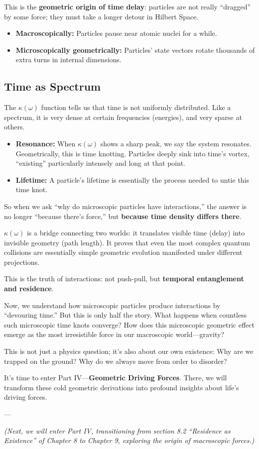 This is the \textbf{geometric origin of time delay}: particles are not really ``dragged'' by some force; they must take a longer detour in Hilbert Space.

\begin{itemize}
\item \textbf{Macroscopically:} Particles pause near atomic nuclei for a while.

\item \textbf{Microscopically geometrically:} Particles' state vectors rotate thousands of extra turns in internal dimensions.
\end{itemize}

\subsection{Time as Spectrum}

The $\kappa(\omega)$ function tells us that time is not uniformly distributed. Like a spectrum, it is very dense at certain frequencies (energies), and very sparse at others.

\begin{itemize}
\item \textbf{Resonance:} When $\kappa(\omega)$ shows a sharp peak, we say the system resonates. Geometrically, this is time knotting. Particles deeply sink into time's vortex, ``existing'' particularly intensely and long at that point.

\item \textbf{Lifetime:} A particle's lifetime is essentially the process needed to untie this time knot.
\end{itemize}

So when we ask ``why do microscopic particles have interactions,'' the answer is no longer ``because there's force,'' but \textbf{because time density differs there}.

$\kappa(\omega)$ is a bridge connecting two worlds: it translates visible time (delay) into invisible geometry (path length). It proves that even the most complex quantum collisions are essentially simple geometric evolution manifested under different projections.

This is the truth of interactions: not push-pull, but \textbf{temporal entanglement and residence}.

Now, we understand how microscopic particles produce interactions by ``devouring time.'' But this is only half the story. What happens when countless such microscopic time knots converge? How does this microscopic geometric effect emerge as the most irresistible force in our macroscopic world---gravity?

This is not just a physics question; it's also about our own existence: Why are we trapped on the ground? Why do we always move from order to disorder?

It's time to enter Part IV---\textbf{Geometric Driving Forces}. There, we will transform these cold geometric derivations into profound insights about life's driving forces.

---

\textit{(Next, we will enter Part IV, transitioning from section 8.2 ``Residence as Existence'' of Chapter 8 to Chapter 9, exploring the origin of macroscopic forces.)}

